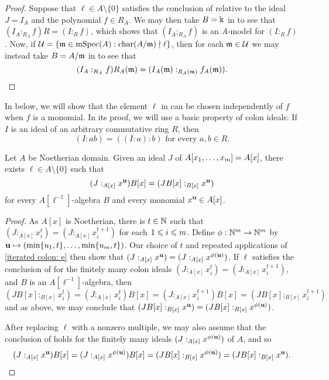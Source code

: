 \documentclass{amsart}
\begin{document}
 \begin{proof}
    Suppose that $\ell \in A \setminus \{0\}$ satisfies the conclusion of  relative to the ideal $J=I_A$ and the polynomial $f \in R_A$.  We may then take $B=\Bbbk$ in  to see that $(I_A:_{R_A} f)R = (I :_{R} f)$, which shows that $(I_A :_{R_A} f)$ is an $A$-model for $(I :_R f)$.
    Now, if $\mathcal{U} = \{\mathfrak{m} \in \operatorname{mSpec}(A) : \operatorname{char}(A/\mathfrak{m}) \nmid \ell\}$, then for each $\mathfrak{m} \in \mathcal{U}$ we may instead take $B=A/\mathfrak{m}$ in  to see that
    \[
       (I_A:_{R_A} f)R_A(\mathfrak{m}) = (I_A(\mathfrak{m}) :_{R_A(\mathfrak{m})} f_A(\mathfrak{m})).
       \qedhere
    \]
\end{proof}

In  below, we will show that the element $\ell$ in  can be chosen independently of $f$ when $f$ is a monomial.
In its proof, we will use a basic property of colon ideals:  If $I$ is an ideal of an arbitrary commutative ring $R$, then
\begin{equation}
\label{iterated colon: e}
 (I: ab) = ((I: a): b) \text{ for every } a,b \in R.
\end{equation}

\begin{corollary}
   \label{all monomial colons: C}
   Let $A$ be Noetherian domain.
   Given an ideal $J$ of $A[x_1, \ldots, x_m] = A[x]$, there exists $\ell \in A \setminus \{0\}$ such that
   \[ (J:_{A[x]} x^{\mathbf{u}}) B[x] = (JB[x]:_{B[x]} x^{\mathbf{u}})\]
   for every $A[\ell^{-1}]$-algebra $B$ and every monomial $x^{\mathbf{u}} \in A[x]$.   
\end{corollary}

\begin{proof}
   As $A[x]$ is Noetherian, there is $t \in \mathbb{N}$ such that $(J:_{A[x]}x_i^t)=(J:_{A[x]}x_i^{t+1})$ for each $1 \leqslant i \leqslant m$.  Define $\phi:  \mathbb{N}^m \to \mathbb{N}^m$ by $\mathbf{u} \mapsto (\min\{u_1, t\}, \ldots, \min \{u_m,t\})$.  Our choice of $t$ and repeated applications of \eqref{iterated colon: e} then show that $(J:_{A[x]}x^{\mathbf{u}}) = (J:_{A[x]}x^{\phi(\mathbf{u})})$.
   If $\ell$ satisfies the conclusion of  for the finitely many colon ideals $(J:_{A[x]}x_i^t)=(J:_{A[x]}x_i^{t+1})$, and $B$ is an $A[\ell^{-1}]$-algebra, then
   \[ (JB[x]:_{B[x]} x_i^{t}) = (J:_{A[x]}x_i^{t})B[x]
                               = (J:_{A[x]}x_i^{t+1})B[x]
                               =(JB[x]:_{B[x]} x_i^{t+1}) \]
   and as above, we may conclude that $(JB[x]:_{B[x]}x^{\mathbf{u}}) = (JB[x]:_{B[x]}x^{\phi(\mathbf{u})})$.

After replacing $\ell$ with a nonzero multiple, we may also assume that the conclusion of  holds for the finitely many ideals $(J:_{A[x]} x^{\phi(\mathbf{u})})$ of $A$, and so
\[ (J:_{A[x]} x^{\mathbf{u}})B[x] = (J:_{A[x]} x^{\phi(\mathbf{u})})B[x] = (JB[x]:_{B[x]} x^{\phi(\mathbf{u})}) = (JB[x]:_{B[x]} x^{\mathbf{u}}). \qedhere\]
\end{proof}
\end{document}
